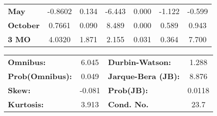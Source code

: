 \begin{center}
\begin{tabular}{lcccccc}
\textbf{May}      &      -0.8602  &        0.134     &    -6.443  &         0.000        &       -1.122    &       -0.599     \\
\textbf{October}  &       0.7661  &        0.090     &     8.489  &         0.000        &        0.589    &        0.943     \\
\textbf{3 MO}     &       4.0320  &        1.871     &     2.155  &         0.031        &        0.364    &        7.700     \\
\bottomrule
\end{tabular}
\begin{tabular}{lclc}
\textbf{Omnibus:}       &  6.045 & \textbf{  Durbin-Watson:     } &    1.288  \\
\textbf{Prob(Omnibus):} &  0.049 & \textbf{  Jarque-Bera (JB):  } &    8.876  \\
\textbf{Skew:}          & -0.081 & \textbf{  Prob(JB):          } &   0.0118  \\
\textbf{Kurtosis:}      &  3.913 & \textbf{  Cond. No.          } &     23.7  \\
\bottomrule
\end{tabular}
\end{center}

